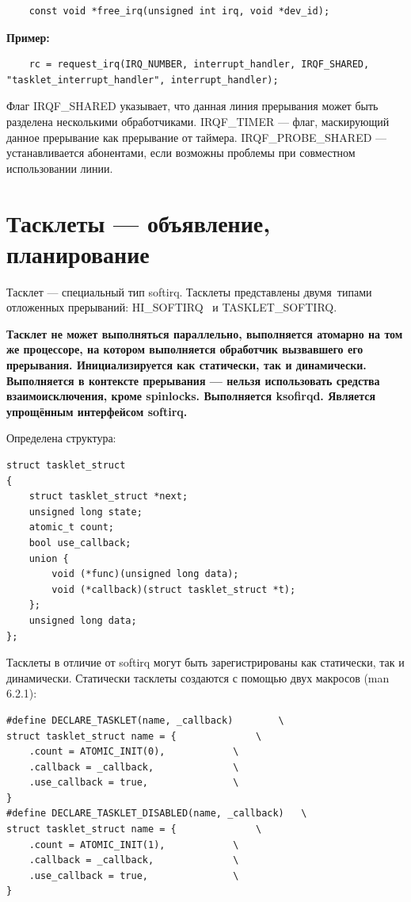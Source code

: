\begin{lstlisting}
	const void *free_irq(unsigned int irq, void *dev_id);
\end{lstlisting}

\textbf{Пример:}
\begin{lstlisting}
	rc = request_irq(IRQ_NUMBER, interrupt_handler, IRQF_SHARED, "tasklet_interrupt_handler", interrupt_handler);
\end{lstlisting}

Флаг IRQF\_SHARED указывает, что данная линия прерывания может быть разделена несколькими обработчиками. IRQF\_TIMER --- флаг, маскирующий данное прерывание как прерывание от таймера. IRQF\_PROBE\_SHARED --- устанавливается абонентами, если возможны проблемы при совместном использовании линии.

\section{Тасклеты --- объявление, планирование}

Тасклет --- специальный тип softirq. Тасклеты представлены двумя типами отложенных прерываний: HI\_SOFTIRQ  и TASKLET\_SOFTIRQ.

\textbf{Тасклет не может выполняться параллельно, выполняется атомарно на том же процессоре, на котором выполняется обработчик вызвавшего его прерывания. Инициализируется как статически, так и динамически. Выполняется в контексте прерывания --- нельзя использовать средства взаимоисключения, кроме spinlocks. Выполняется ksofirqd. Является упрощённым интерфейсом softirq.}

Определена структура:

\begin{lstlisting}
struct tasklet_struct
{
	struct tasklet_struct *next;
	unsigned long state;
	atomic_t count;
	bool use_callback;
	union {
		void (*func)(unsigned long data);
		void (*callback)(struct tasklet_struct *t);
	};
	unsigned long data;
};
\end{lstlisting}

Тасклеты в отличие от softirq могут быть зарегистрированы как статически, так и динамически. Статически тасклеты создаются с помощью двух макросов (man 6.2.1):

\begin{lstlisting}
#define DECLARE_TASKLET(name, _callback)		\
struct tasklet_struct name = {				\
	.count = ATOMIC_INIT(0),			\
	.callback = _callback,				\
	.use_callback = true,				\
}
#define DECLARE_TASKLET_DISABLED(name, _callback)	\
struct tasklet_struct name = {				\
	.count = ATOMIC_INIT(1),			\
	.callback = _callback,				\
	.use_callback = true,				\
}
\end{lstlisting}

